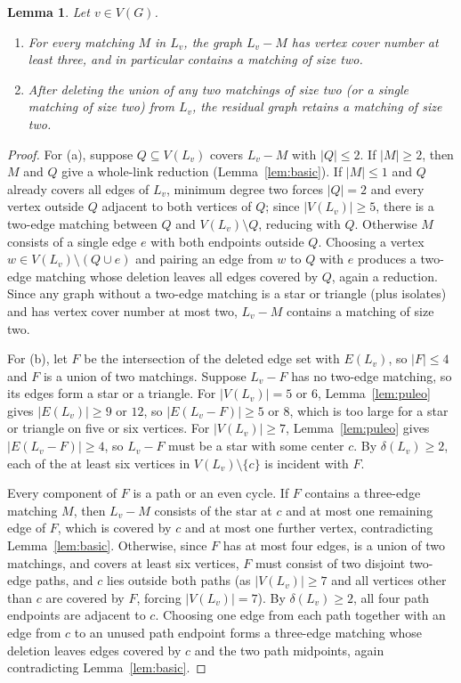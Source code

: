 \documentclass[11pt]{article}
\newtheorem{lemma}[theorem]{Lemma}
\begin{document}
\begin{lemma}\label{lem:vc-and-two-matchings}
Let $v\in V(G)$.
\begin{enumerate}
\item[(a)] For every matching $M$ in $L_v$, the graph $L_v-M$ has vertex cover number at least three, and in particular contains a matching of size two.
\item[(b)] After deleting the union of any two matchings of size two (or a single matching of size two) from $L_v$, the residual graph retains a matching of size two.
\end{enumerate}
\end{lemma}

\begin{proof}
For (a), suppose $Q\subseteq V(L_v)$ covers $L_v-M$ with $|Q|\leq 2$. If $|M|\geq 2$, then $M$ and $Q$ give a whole-link reduction (Lemma~\ref{lem:basic}). If $|M|\leq 1$ and $Q$ already covers all edges of $L_v$, minimum degree two forces $|Q|=2$ and every vertex outside $Q$ adjacent to both vertices of $Q$; since $|V(L_v)|\geq 5$, there is a two-edge matching between $Q$ and $V(L_v)\setminus Q$, reducing with $Q$. Otherwise $M$ consists of a single edge $e$ with both endpoints outside $Q$. Choosing a vertex $w\in V(L_v)\setminus(Q\cup e)$ and pairing an edge from $w$ to $Q$ with $e$ produces a two-edge matching whose deletion leaves all edges covered by $Q$, again a reduction. Since any graph without a two-edge matching is a star or triangle (plus isolates) and has vertex cover number at most two, $L_v-M$ contains a matching of size two.

For (b), let $F$ be the intersection of the deleted edge set with $E(L_v)$, so $|F|\leq 4$ and $F$ is a union of two matchings. Suppose $L_v-F$ has no two-edge matching, so its edges form a star or a triangle. For $|V(L_v)|=5$ or $6$, Lemma~\ref{lem:puleo} gives $|E(L_v)|\geq 9$ or $12$, so $|E(L_v-F)|\geq 5$ or $8$, which is too large for a star or triangle on five or six vertices. For $|V(L_v)|\geq 7$, Lemma~\ref{lem:puleo} gives $|E(L_v-F)|\geq 4$, so $L_v-F$ must be a star with some center $c$. By $\delta(L_v)\geq 2$, each of the at least six vertices in $V(L_v)\setminus\{c\}$ is incident with $F$.

Every component of $F$ is a path or an even cycle. If $F$ contains a three-edge matching $M$, then $L_v-M$ consists of the star at $c$ and at most one remaining edge of $F$, which is covered by $c$ and at most one further vertex, contradicting Lemma~\ref{lem:basic}. Otherwise, since $F$ has at most four edges, is a union of two matchings, and covers at least six vertices, $F$ must consist of two disjoint two-edge paths, and $c$ lies outside both paths (as $|V(L_v)|\geq 7$ and all vertices other than $c$ are covered by $F$, forcing $|V(L_v)|=7$). By $\delta(L_v)\geq 2$, all four path endpoints are adjacent to $c$. Choosing one edge from each path together with an edge from $c$ to an unused path endpoint forms a three-edge matching whose deletion leaves edges covered by $c$ and the two path midpoints, again contradicting Lemma~\ref{lem:basic}.
\end{proof}
\end{document}
